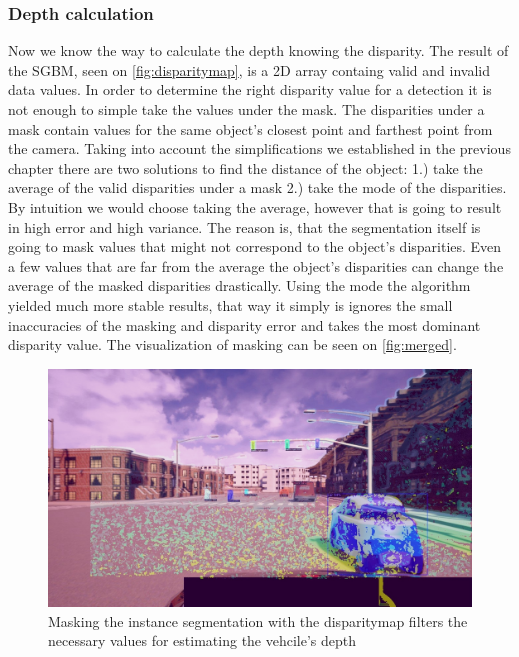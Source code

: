 \subsubsection{Depth calculation}
Now we know the way to calculate the depth knowing the disparity. The result of
the SGBM, seen on \autoref{fig:disparitymap}, is a 2D array containg valid and
invalid data values. In order to determine the right disparity value
for a detection it is not enough to simple take the values under the mask. The
disparities under a mask contain values for the same object's closest point and
farthest point from the camera. Taking into account the simplifications we
established in the previous chapter there are two solutions to find the distance
of the object: 1.) take the average of the valid disparities under a mask 2.)
take the mode of the disparities. By intuition we would choose taking the
average, however that is going to result in high error and high variance. The
reason is, that the segmentation itself is going to mask values that might not
correspond to the object's disparities. Even a few values that are far from the
average the object's disparities can change the average of the masked
disparities drastically. Using the mode the algorithm yielded much more stable
results, that way it simply is ignores the small inaccuracies of the masking and
disparity error and takes the most dominant disparity value. The visualization
of masking can be seen on \autoref{fig:merged}.

\begin{figure}[!ht]
    \centering
    \includegraphics[width=150mm, keepaspectratio]{figures/335merged.jpg}
    \caption{Masking the instance segmentation with the disparitymap filters the necessary values for estimating the vehcile's depth}
    \label{fig:merged}
\end{figure}

